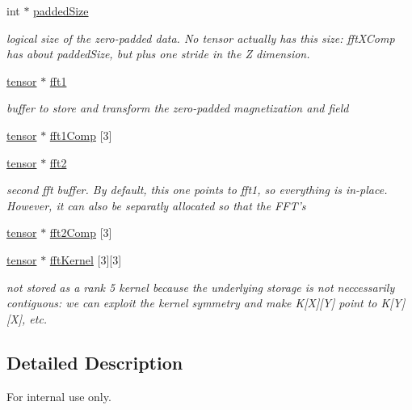 \begin{DoxyCompactItemize}
int $\ast$ \hyperlink{structgpuconv2_aebc50066934a168c5a1a90f550bd7a84}{paddedSize}
\begin{DoxyCompactList}\small\item\em logical size of the zero-\/padded data. No tensor actually has this size: fftXComp has about paddedSize, but plus one stride in the Z dimension. \item\end{DoxyCompactList}\item 
\hyperlink{structtensor}{tensor} $\ast$ \hyperlink{structgpuconv2_adfe815ea2f0f1bc3fcc9253b0bf7769f}{fft1}
\begin{DoxyCompactList}\small\item\em buffer to store and transform the zero-\/padded magnetization and field \item\end{DoxyCompactList}\item 
\hyperlink{structtensor}{tensor} $\ast$ \hyperlink{structgpuconv2_aa04ceddba4c4ec6d485fcc1df2545a6a}{fft1Comp} \mbox{[}3\mbox{]}
\item 
\hyperlink{structtensor}{tensor} $\ast$ \hyperlink{structgpuconv2_afa4419639a375a47f5665586401ae8cc}{fft2}
\begin{DoxyCompactList}\small\item\em second fft buffer. By default, this one points to fft1, so everything is in-\/place. However, it can also be separatly allocated so that the FFT's \item\end{DoxyCompactList}\item 
\hyperlink{structtensor}{tensor} $\ast$ \hyperlink{structgpuconv2_ae20f81460c1c8355a7af279f9c660468}{fft2Comp} \mbox{[}3\mbox{]}
\item 
\hyperlink{structtensor}{tensor} $\ast$ \hyperlink{structgpuconv2_a2f94841448d094437cccceaf0b468bdc}{fftKernel} \mbox{[}3\mbox{]}\mbox{[}3\mbox{]}
\begin{DoxyCompactList}\small\item\em not stored as a rank 5 kernel because the underlying storage is not neccessarily contiguous: we can exploit the kernel symmetry and make K\mbox{[}X\mbox{]}\mbox{[}Y\mbox{]} point to K\mbox{[}Y\mbox{]}\mbox{[}X\mbox{]}, etc. \item\end{DoxyCompactList}\end{DoxyCompactItemize}


\subsection{Detailed Description}
\begin{DoxyInternal}{For internal use only.}
\end{DoxyInternal}


